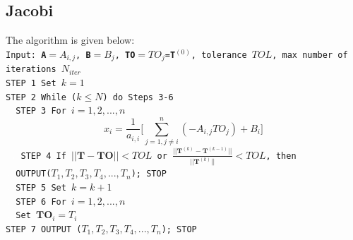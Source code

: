 \documentclass[12pt]{amsart}   %
\begin{document}
\subsection{Jacobi} The algorithm is given below: \\
{\tt{Input: \textbf{A}$= A_{i,j}$, \textbf{B}$=B_j$, \textbf{TO}$=TO_j$=\textbf{T}$^{(0)}$, tolerance $TOL$, max number of iterations $N_{iter}$ \\
STEP 1 Set $k=1$ \\
STEP 2 While ($k \leq N$) do Steps 3-6 \\
\textcolor{white}{.}\hspace{1cm} STEP 3 For $i=1,2,...,n$
\begin{equation*}
    x_{i}= \frac{1}{a_{i,i}}\bigg[ \sum_{j=1,j\neq i}^n (-A_{i,j} TO_j)+B_i \bigg]
    \end{equation*}
\textcolor{white}{.}\hspace{1cm} STEP 4 If $||\textbf{T}-\textbf{TO}||<TOL$ or $\frac{||\textbf{T}^{(k)}-\textbf{T}^{(k-1)}||}{||\textbf{T}^{(k)}||}<TOL$, then \\ \textcolor{white}{.}\hspace{6cm} OUTPUT($T_1,T_2,T_3,T_4,...,T_n$); {STOP} \\
\textcolor{white}{.}\hspace{1cm} STEP 5 Set $k=k+1$ \\
\textcolor{white}{.}\hspace{1cm} STEP 6 For $i=1,2,...,n$\\
\textcolor{white}{.}\hspace{2.5cm} Set $\textbf{TO}_i = T_i$\\
STEP 7 OUTPUT ($T_1,T_2,T_3,T_4,...,T_n$); STOP\\
}} \\
\end{document}
